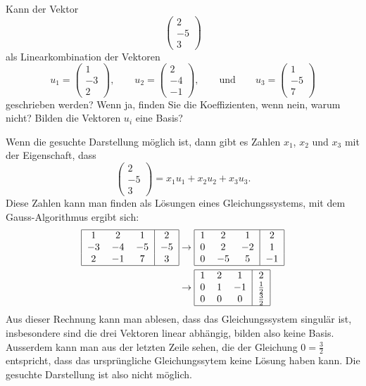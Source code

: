 Kann der Vektor
\[
\begin{pmatrix}
2\\-5\\3
\end{pmatrix}
\]
als Linearkombination der Vektoren
\[
u_1=\begin{pmatrix}
1\\-3\\2
\end{pmatrix},
\qquad
u_2=\begin{pmatrix}
2\\-4\\-1
\end{pmatrix},
\qquad\text{und}\qquad
u_3=\begin{pmatrix}
1\\-5\\7
\end{pmatrix}
\]
geschrieben werden? Wenn ja, finden Sie die Koeffizienten, wenn nein,
warum nicht? Bilden die Vektoren $u_i$ eine Basis?

\begin{loesung}
Wenn die gesuchte Darstellung möglich ist, dann gibt es Zahlen
$x_1$, $x_2$ und $x_3$ mit der Eigenschaft, dass
\[
\begin{pmatrix}
2\\-5\\3
\end{pmatrix}
=x_1u_1+x_2u_2+x_3u_3.
\]
Diese  Zahlen kann man finden als Lösungen eines Gleichungssystems,
mit dem Gauss-Algorithmus ergibt sich:
\begin{align*}
\begin{tabular}{|ccc|c|}
\hline
1&2&1&2\\
$-3$&$-4$&$-5$&$-5$\\
2&$-1$&7&3\\
\hline
\end{tabular}
&\rightarrow
\begin{tabular}{|ccc|c|}
\hline
1&2&1&2\\
0&2&$-2$&1\\
0&$-5$&5&$-1$\\
\hline
\end{tabular}
\\
&\rightarrow
\begin{tabular}{|ccc|c|}
\hline
1&2&1&2\\
0&1&$-1$&$\frac12$\\
0&0&0&$\frac32$\\
\hline
\end{tabular}
\end{align*}
Aus dieser Rechnung kann man ablesen, dass das Gleichungssystem singulär
ist, insbesondere sind die drei Vektoren linear abhängig, bilden also
keine Basis. Ausserdem kann man aus der letzten Zeile sehen, die der
Gleichung $0=\frac32$ entspricht, dass das ursprüngliche Gleichungssytem
keine Lösung haben kann. Die gesuchte Darstellung ist also nicht möglich.
\end{loesung}

